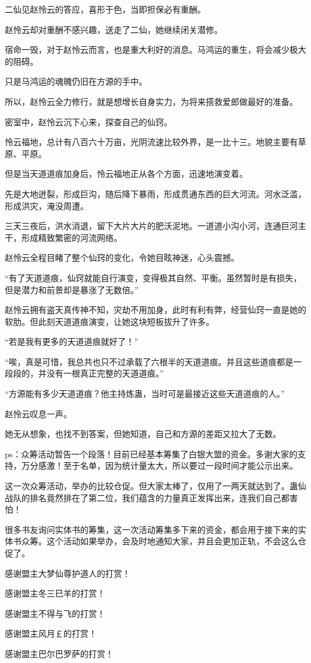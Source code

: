 \begin{this_body}
二仙见赵怜云的答应，喜形于色，当即担保必有重酬。

赵怜云却对重酬不感兴趣，送走了二仙，她继续闭关潜修。

宿命一毁，对于赵怜云而言，也是重大利好的消息。马鸿运的重生，将会减少极大的阻碍。

只是马鸿运的魂魄仍旧在方源的手中。

所以，赵怜云全力修行，就是想增长自身实力，为将来搭救爱郎做最好的准备。

密室中，赵怜云沉下心来，探查自己的仙窍。

怜云福地，总计有八百六十万亩，光阴流速比较外界，是一比十三。地貌主要有草原、平原。

但是当天道道痕加身后，怜云福地正从各个方面，迅速地演变着。

先是大地迸裂，形成巨沟，随后降下暴雨，形成贯通东西的巨大河流。河水泛滥，形成洪灾，淹没周遭。

三天三夜后，洪水消退，留下大片大片的肥沃泥地。一道道小沟小河，连通巨河主干，形成精致繁密的河流网络。

赵怜云全程目睹了整个仙窍的变化，令她目眩神迷，心头震撼。

“有了天道道痕，仙窍就能自行演变，变得极其自然、平衡。虽然暂时是有损失，但是潜力和前景却是暴涨了无数倍。”

赵怜云拥有盗天真传神不知，灾劫不用加身，此时有利有弊，经营仙窍一直是她的软肋。但此刻天道道痕演变，让她这块短板拔升了许多。

“若是我有更多的天道道痕就好了！”

“唉，真是可惜，我总共也只不过承载了六根半的天道道痕。并且这些道痕都是一段段的，并没有一根真正完整的天道道痕。”

“方源能有多少天道道痕？他主持炼蛊，当时可是最接近这些天道道痕的人。”

赵怜云叹息一声。

她无从想象，也找不到答案，但她知道，自己和方源的差距又拉大了无数。

ps：众筹活动暂告一个段落！目前已经基本筹集了白银大盟的资金。多谢大家的支持，万分感激！至于名单，因为统计量太大，所以要过一段时间才能公示出来。

这一次众筹活动，举办的比较仓促。但大家太棒了，仅用了一两天就达到了。蛊仙战队的排名竟然排在了第二位，我们蕴含的力量真正发挥出来，连我们自己都害怕！

很多书友询问实体书的筹集，这一次活动筹集多下来的资金，都会用于接下来的实体书众筹。这个活动如果举办，会及时地通知大家，并且会更加正轨，不会这么仓促了。

感谢盟主大梦仙尊护道人的打赏！

感谢盟主冬三巳羊的打赏！

感谢盟主不得与飞的打赏！

感谢盟主风月￡的打赏！

感谢盟主巴尔巴罗萨的打赏！

\end{this_body}

